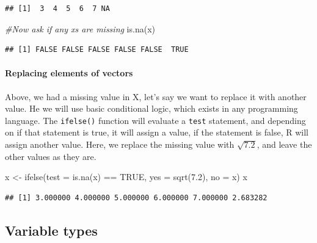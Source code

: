 \documentclass[
]{article}
\newenvironment{Shaded}{\begin{snugshade}}{\end{snugshade}}
\newcommand{\AttributeTok}[1]{\textcolor[rgb]{0.77,0.63,0.00}{#1}}
\newcommand{\CommentTok}[1]{\textcolor[rgb]{0.56,0.35,0.01}{\textit{#1}}}
\newcommand{\ConstantTok}[1]{\textcolor[rgb]{0.00,0.00,0.00}{#1}}
\newcommand{\FloatTok}[1]{\textcolor[rgb]{0.00,0.00,0.81}{#1}}
\newcommand{\FunctionTok}[1]{\textcolor[rgb]{0.00,0.00,0.00}{#1}}
\newcommand{\NormalTok}[1]{#1}
\newcommand{\OtherTok}[1]{\textcolor[rgb]{0.56,0.35,0.01}{#1}}
\newcommand{\SpecialCharTok}[1]{\textcolor[rgb]{0.00,0.00,0.00}{#1}}
\begin{document}
\begin{verbatim}
## [1]  3  4  5  6  7 NA
\end{verbatim}

\begin{Shaded}
\begin{Highlighting}[]
\CommentTok{\#Now ask if any x\textquotesingle{}s are missing}
\FunctionTok{is.na}\NormalTok{(x)}
\end{Highlighting}
\end{Shaded}

\begin{verbatim}
## [1] FALSE FALSE FALSE FALSE FALSE  TRUE
\end{verbatim}

\hypertarget{replacing-elements-of-vectors}{%
\paragraph{Replacing elements of vectors}\label{replacing-elements-of-vectors}}

Above, we had a missing value in X, let's say we want to replace it with
another value. He we will use basic conditional logic, which exists in
any programming language. The \texttt{ifelse()} function will evaluate a \texttt{test}
statement, and depending on if that statement is true, it will assign a
value, if the statement is false, R will assign another value. Here, we
replace the missing value with \(\sqrt{7.2}\), and leave the other values
as they are.

\begin{Shaded}
\begin{Highlighting}[]
\NormalTok{x }\OtherTok{\textless{}{-}} \FunctionTok{ifelse}\NormalTok{(}\AttributeTok{test =} \FunctionTok{is.na}\NormalTok{(x) }\SpecialCharTok{==} \ConstantTok{TRUE}\NormalTok{,}
            \AttributeTok{yes =}  \FunctionTok{sqrt}\NormalTok{(}\FloatTok{7.2}\NormalTok{),}
            \AttributeTok{no =}\NormalTok{  x)}
\NormalTok{x}
\end{Highlighting}
\end{Shaded}

\begin{verbatim}
## [1] 3.000000 4.000000 5.000000 6.000000 7.000000 2.683282
\end{verbatim}

\hypertarget{variable-types}{%
\subsection{Variable types}\label{variable-types}}
\end{document}
